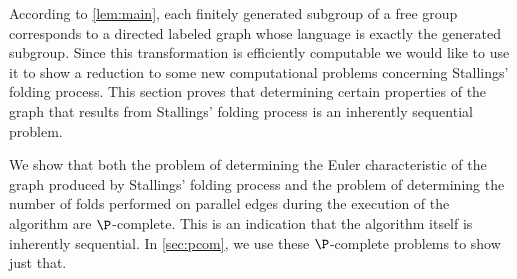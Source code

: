 \documentclass{article}
\begin{document}
According to \autoref{lem:main}, each finitely generated subgroup of a free group corresponds to a directed labeled graph whose language is exactly the generated subgroup.
Since this transformation is efficiently computable we would like to use it to show a reduction to some new computational problems concerning Stallings' folding process.
%
%
This section proves that determining certain properties of the graph that results from Stallings' folding process is an inherently sequential problem.

%
We show that both the problem of determining the Euler characteristic of the graph produced by Stallings' folding process and the problem of determining the number of folds performed on parallel edges during the execution of the algorithm are $\P$-complete.
This is an indication that the algorithm itself is inherently sequential.
In \autoref{sec:pcom}, we use these $\P$-complete problems to show just that.
\end{document}
